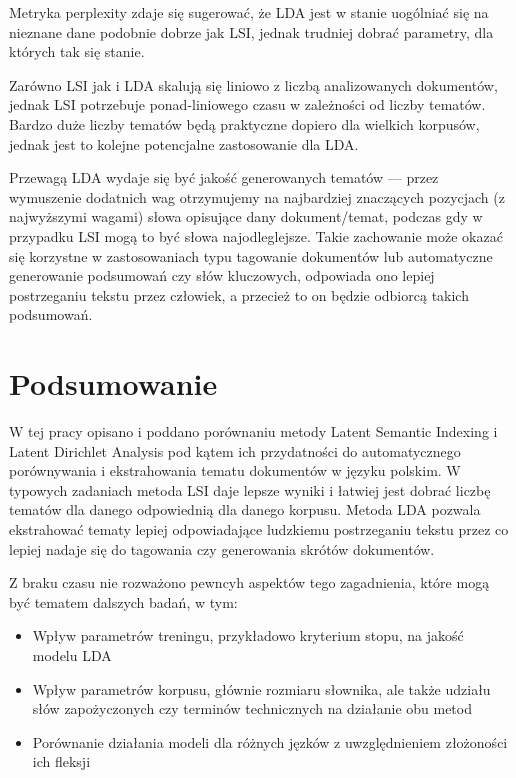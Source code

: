 \documentclass[11pt,a4paper]{article}
\begin{document}
Metryka perplexity zdaje się sugerować, że LDA jest w stanie uogólniać się na
nieznane dane podobnie dobrze jak LSI, jednak trudniej dobrać parametry, dla
których tak się stanie.

Zarówno LSI jak i LDA skalują się liniowo z liczbą analizowanych dokumentów,
jednak LSI potrzebuje ponad-liniowego czasu w zależności od liczby tematów.
Bardzo duże liczby tematów będą praktyczne dopiero dla wielkich korpusów,
jednak jest to kolejne potencjalne zastosowanie dla LDA.

Przewagą LDA wydaje się być jakość generowanych tematów --- przez wymuszenie
dodatnich wag otrzymujemy na najbardziej znaczących pozycjach (z najwyższymi
wagami) słowa opisujące dany dokument/temat, podczas gdy w przypadku LSI mogą
to być słowa najodleglejsze. Takie zachowanie może okazać się korzystne w
zastosowaniach typu tagowanie dokumentów lub automatyczne generowanie
podsumowań czy słów kluczowych, odpowiada ono lepiej postrzeganiu tekstu przez
człowiek, a przecież to on będzie odbiorcą takich podsumowań.

\pagebreak

\section{Podsumowanie}

W tej pracy opisano i poddano porównaniu metody Latent Semantic Indexing i
Latent Dirichlet Analysis pod kątem ich przydatności do automatycznego
porównywania i ekstrahowania tematu dokumentów w języku polskim. W typowych
zadaniach metoda LSI daje lepsze wyniki i łatwiej jest dobrać liczbę tematów
dla danego odpowiednią dla danego korpusu. Metoda LDA pozwala ekstrahować
tematy lepiej odpowiadające ludzkiemu postrzeganiu tekstu przez co lepiej
nadaje się do tagowania czy generowania skrótów dokumentów.

Z braku czasu nie rozważono pewncyh aspektów tego zagadnienia, które mogą być
tematem dalszych badań, w tym:

\begin{itemize}
\item Wpływ parametrów treningu, przykładowo kryterium stopu, na jakość modelu LDA
\item Wpływ parametrów korpusu, głównie rozmiaru słownika, ale także udziału słów zapożyczonych czy terminów technicznych na działanie obu metod
\item Porównanie działania modeli dla różnych jęzków z uwzględnieniem złożoności ich fleksji
\end{itemize}
\end{document}
